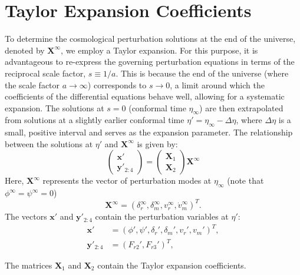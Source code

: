 \documentclass[%
 reprint,
 amsmath,amssymb,
 prd, %
]{revtex4-2}
\begin{document}
\appendix
\section{Taylor Expansion Coefficients}\label{sec:Taylor}
To determine the cosmological perturbation solutions at the end of the universe, denoted by $\mathbf{X}^\infty$, we employ a Taylor expansion. For this purpose, it is advantageous to re-express the governing perturbation equations in terms of the reciprocal scale factor, $s \equiv 1/a$. This is because the end of the universe (where the scale factor $a \to \infty$) corresponds to $s \to 0$, a limit around which the coefficients of the differential equations behave well, allowing for a systematic expansion. The solutions at $s=0$ (conformal time $\eta_\infty$) are then extrapolated from solutions at a slightly earlier conformal time $\eta' = \eta_\infty - \Delta\eta$, where $\Delta\eta$ is a small, positive interval and serves as the expansion parameter. The relationship between the solutions at $\eta'$ and $\mathbf{X}^\infty$ is given by:
\begin{equation}\label{eq:taylor_relation}
\begin{pmatrix}
\mathbf{x}' \\
\mathbf{y}'_{2:4}
\end{pmatrix}
=
\begin{pmatrix}
\mathbf{X}_1 \\
\mathbf{X}_2
\end{pmatrix}
\mathbf{X}^\infty
\end{equation}
Here, $\mathbf{X}^\infty$ represents the vector of perturbation modes at $\eta_\infty$ (note that $\phi^\infty=\psi^\infty=0$)
\begin{equation}\label{eq:X_infty_def}
    \mathbf{X}^\infty = (\delta_r^\infty, \delta_m^\infty, v_r^\infty, \dot{v}_m^\infty)^T.
\end{equation}
The vectors $\mathbf{x}'$ and $\mathbf{y}'_{2:4}$ contain the perturbation variables at $\eta'$:
\begin{equation}\label{eq:xy_prime_def}
\begin{aligned}
    \mathbf{x}' &= (\phi', \psi', \delta_r', \delta_m', v_r', v_m')^T, \\
    \mathbf{y}'_{2:4} &= (F_{r2}', F_{r3}')^T,
\end{aligned}
\end{equation}

The matrices $\mathbf{X}_1$ and $\mathbf{X}_2$ contain the Taylor expansion coefficients.
\end{document}
